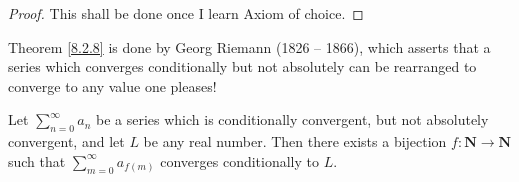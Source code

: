 \begin{proof}
    This shall be done once I learn Axiom of choice.
\end{proof}

\begin{note}
    Theorem \ref{8.2.8} is done by Georg Riemann (1826 -- 1866), which asserts that a series which converges conditionally but not absolutely can be rearranged to converge to any value one pleases!
\end{note}

\begin{theorem}\label{8.2.8}
    Let \(\sum_{n = 0}^\infty a_n\) be a series which is conditionally convergent, but not absolutely convergent, and let \(L\) be any real number.
    Then there exists a bijection \(f : \mathbf{N} \to \mathbf{N}\) such that \(\sum_{m = 0}^\infty a_{f(m)}\) converges conditionally to \(L\).
\end{theorem}

